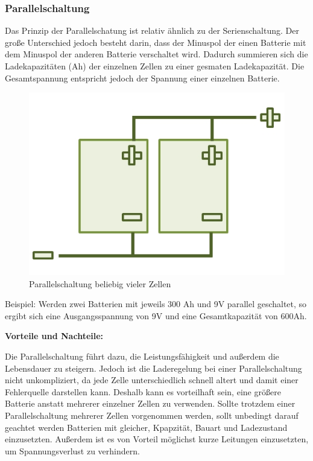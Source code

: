 \subsubsection{Parallelschaltung}
Das Prinzip der Parallelschatung ist relativ ähnlich zu der Serienschaltung. Der große Unterschied jedoch besteht darin, dass der Minuspol der einen Batterie mit dem Minuspol der anderen Batterie verschaltet wird. Dadurch summieren sich die Ladekapazitäten (Ah) der einzelnen Zellen zu einer gesmaten Ladekapazität. Die Gesamtspannung entspricht jedoch der Spannung einer einzelnen Batterie. 

\begin{figure}[H]
	\begin{center}
		\includegraphics[scale=1.0]{figures/Akku/ParallelschaltungzweierBatterien.org.jpg}
		\caption{Parallelschaltung beliebig vieler Zellen}
	\end{center}
\end{figure}

Beispiel: Werden zwei Batterien mit jeweils 300 Ah und 9V parallel geschaltet, so ergibt sich eine Ausgangsspannung von 9V und eine Gesamtkapazität von 600Ah. \medskip

\textbf{Vorteile und Nachteile:}

Die Parallelschaltung führt dazu, die Leistungsfähigkeit und außerdem die Lebensdauer zu steigern. Jedoch ist die Laderegelung bei einer Parallelschaltung nicht unkompliziert, da jede Zelle unterschiedlich schnell altert und damit einer Fehlerquelle darstellen kann. Deshalb kann es vorteilhaft sein, eine größere Batterie anstatt mehrerer einzelner Zellen zu verwenden. Sollte trotzdem einer Parallelschaltung mehrerer Zellen vorgenommen werden, sollt unbedingt darauf geachtet werden Batterien mit gleicher, Kpapzität, Bauart und Ladezustand einzusetzten. Außerdem ist es von Vorteil möglichst kurze Leitungen einzusetzten, um Spannungsverlust zu verhindern.
\newpage

